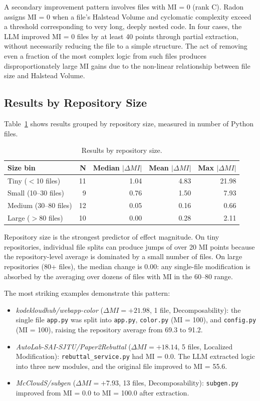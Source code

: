 \documentclass[sigconf,review,anonymous]{acmart}
\begin{document}
A secondary improvement pattern involves files with MI = 0 (rank C). Radon assigns MI = 0 when a file's Halstead Volume and cyclomatic complexity exceed a threshold corresponding to very long, deeply nested code. In four cases, the LLM improved MI = 0 files by at least 40 points through partial extraction, without necessarily reducing the file to a simple structure. The act of removing even a fraction of the most complex logic from such files produces disproportionately large MI gains due to the non-linear relationship between file size and Halstead Volume.

\subsection{Results by Repository Size}

Table~\ref{tab:exp5_size} shows results grouped by repository size, measured in number of Python files.

\begin{table}[H]
\centering
\small
\caption{Results by repository size.}
\label{tab:exp5_size}
\begin{tabular}{lrrrr}
\toprule
\textbf{Size bin} & \textbf{N} & \textbf{Median $|\Delta MI|$} & \textbf{Mean $|\Delta MI|$} & \textbf{Max $|\Delta MI|$} \\
\midrule
Tiny ($<$10 files)    & 11 & 1.04 & 4.83 & 21.98 \\
Small (10--30 files)  & 9  & 0.76 & 1.50 & 7.93  \\
Medium (30--80 files) & 12 & 0.05 & 0.16 & 0.66  \\
Large ($>$80 files)   & 10 & 0.00 & 0.28 & 2.11  \\
\bottomrule
\end{tabular}
\end{table}

Repository size is the strongest predictor of effect magnitude. On tiny repositories, individual file splits can produce jumps of over 20 MI points because the repository-level average is dominated by a small number of files. On large repositories (80+ files), the median change is 0.00: any single-file modification is absorbed by the averaging over dozens of files with MI in the 60--80 range.

The most striking examples demonstrate this pattern:

\begin{itemize}[nosep]
    \item \textit{kodekloudhub/webapp-color} ($\Delta MI = +21.98$, 1 file, Decomposability): the single file \texttt{app.py} was split into \texttt{app.py}, \texttt{color.py} (MI = 100), and \texttt{config.py} (MI = 100), raising the repository average from 69.3 to 91.2.
    \item \textit{AutoLab-SAI-SJTU/Paper2Rebuttal} ($\Delta MI = +18.14$, 5 files, Localized Modification): \texttt{rebuttal\_service.py} had MI = 0.0. The LLM extracted logic into three new modules, and the original file improved to MI = 55.6.
    \item \textit{McCloudS/subgen} ($\Delta MI = +7.93$, 13 files, Decomposability): \texttt{subgen.py} improved from MI = 0.0 to MI = 100.0 after extraction.
\end{itemize}
\end{document}
